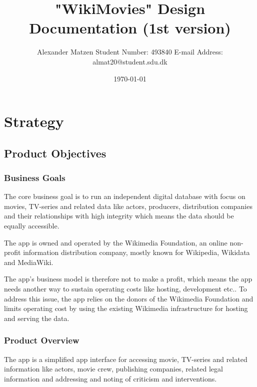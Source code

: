 \documentclass[11pt]{article}
\begin{document}
\setlength\parindent{0pt}
\setlength{\parskip}{1em}
\pagestyle{empty}

\title{"WikiMovies" Design Documentation (1st version)}
\author{Alexander Matzen \addvspace{1em} Student Number: 493840 \newline E-mail Address: almat20@student.sdu.dk}
\date{\today}


\pagecolor{white}

\tableofcontents

\addvspace{2.5cm}

\section{Strategy}

\subsection{Product Objectives}

\subsubsection{Business Goals}
The core business goal is to run an independent digital database with focus on movies, TV-series and related data like actors, producers, distribution companies and their relationships with high integrity which means the data should be equally accessible.


The app is owned and operated by the Wikimedia Foundation, an online non-profit information distribution company, mostly known for Wikipedia, Wikidata and MediaWiki.

The app's business model is therefore not to make a profit, which means the app needs another way to sustain operating costs like hosting, development etc.. To address this issue, the app relies on the donors of the Wikimedia Foundation and limits operating cost by using the existing Wikimedia infrastructure for hosting and serving the data.




\subsubsection{Product Overview}

The app is a simplified app interface for accessing movie, TV-series and related information like actors, movie crew, publishing companies, related legal information and addressing and noting of criticism and interventions.
\end{document}
